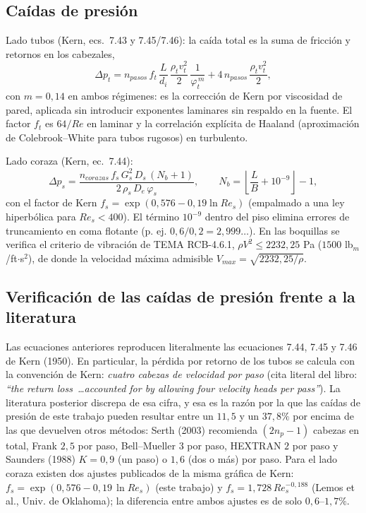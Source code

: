\documentclass[11pt,a4paper]{article}
\begin{document}
\subsection{Ca\'idas de presi\'on}
\label{sec:dp}

Lado tubos (Kern, ecs.~7.43 y 7.45/7.46): la ca\'ida total es la suma de
fricci\'on y retornos en los cabezales,
\begin{equation}
\Delta p_t = n_{pasos} \, f_t \, \frac{L}{d_i}\,
\frac{\rho_t v_t^2}{2}\,\frac{1}{\varphi_t^{\,m}}
+ 4 \, n_{pasos} \, \frac{\rho_t v_t^2}{2},
\label{eq:dpt}
\end{equation}
con $m = 0{,}14$ en ambos r\'egimenes: es la correcci\'on de Kern por 
viscosidad de pared, aplicada sin introducir exponentes laminares sin 
respaldo en la fuente. El factor $f_t$ es $64/Re$ en laminar y la correlaci\'on
expl\'icita de Haaland (aproximaci\'on de Colebrook--White para tubos rugosos)
en turbulento.

Lado coraza (Kern, ec.~7.44):
\begin{equation}
\Delta p_s = \frac{n_{corazas} \, f_s \, G_s^2 \, D_s \, (N_b + 1)}
{2 \, \rho_s \, D_e \, \varphi_s},
\qquad
N_b = \left\lfloor \frac{L}{B} + 10^{-9} \right\rfloor - 1 ,
\label{eq:dps}
\end{equation}
con el factor de Kern $f_s = \exp(0{,}576 - 0{,}19 \ln Re_s)$ (empalmado a una
ley hiperb\'olica para $Re_s < 400$). El t\'ermino $10^{-9}$ dentro del piso
elimina errores de truncamiento en coma flotante (p. ej. $0{,}6/0{,}2 =
2{,}999\ldots$). En las boquillas se verifica el criterio de vibraci\'on de
TEMA RCB-4.6.1, $\rho V^2 \le 2232{,}25$ Pa ($1500$ lb$_m$/ft$\cdot$s$^2$), de
donde la velocidad m\'axima admisible $V_{max} = \sqrt{2232{,}25/\rho}$.


\subsection{Verificaci\'on de las ca\'idas de presi\'on frente a la
literatura}

Las ecuaciones anteriores reproducen literalmente las ecuaciones 7.44, 7.45 y
7.46 de Kern (1950). En particular, la p\'erdida por retorno de los tubos se
calcula con la convenci\'on de Kern: \emph{cuatro cabezas de velocidad por
paso} (cita literal del libro: \emph{``the return loss~\ldots accounted for
by allowing four velocity heads per pass''}). La literatura posterior discrepa
de esa cifra, y esa es la raz\'on por la que las ca\'idas de presi\'on de
este trabajo pueden resultar entre un $11,5$ y un $37,8\%$ por encima de
las que devuelven otros m\'etodos: Serth (2003) recomienda $(2 n_p - 1)$ cabezas
en total, Frank $2{,}5$ por paso, Bell--Mueller $3$ por paso, HEXTRAN $2$ por
paso y Saunders (1988) $K = 0{,}9$ (un paso) o $1{,}6$ (dos o m\'as) por paso.
Para el lado coraza existen dos ajustes publicados de la misma gr\'afica de
Kern: $f_s = \exp(0{,}576 - 0{,}19\, \ln Re_s)$ (este trabajo) y
$f_s = 1{,}728\, Re_s^{-0{,}188}$ (Lemos et al., Univ. de Oklahoma); la
diferencia entre ambos ajustes es de solo $0{,}6$--$1{,}7\%$.
\end{document}
